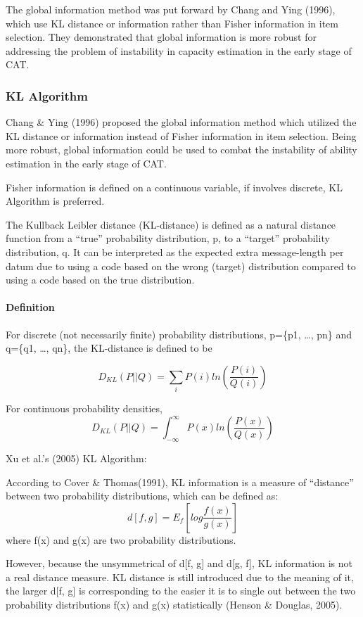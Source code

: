 \documentclass[
]{article}
\begin{document}
The global information method was put forward by Chang and Ying (1996),
which use KL distance or information rather than Fisher information in
item selection. They demonstrated that global information is more robust
for addressing the problem of instability in capacity estimation in the
early stage of CAT.

\hypertarget{kl-algorithm}{%
\subsubsection{KL Algorithm}\label{kl-algorithm}}

Chang \& Ying (1996) proposed the global information method which
utilized the KL distance or information instead of Fisher information in
item selection. Being more robust, global information could be used to
combat the instability of ability estimation in the early stage of CAT.

Fisher information is defined on a continuous variable, if involves
discrete, KL Algorithm is preferred.

The Kullback Leibler distance (KL-distance) is defined as a natural
distance function from a ``true'' probability distribution, p, to a
``target'' probability distribution, q. It can be interpreted as the
expected extra message-length per datum due to using a code based on the
wrong (target) distribution compared to using a code based on the true
distribution.

\hypertarget{definition-2}{%
\paragraph{Definition}\label{definition-2}}

For discrete (not necessarily finite) probability distributions, p=\{p1,
\ldots, pn\} and q=\{q1, \ldots, qn\}, the KL-distance is defined to be

\[D_{KL}(P||Q)=\sum_i P(i)ln(\frac {P(i)}{Q(i)})\]

For continuous probability densities,
\[D_{KL}(P||Q)=\int_{-\infty}^{\infty} P(x)ln(\frac {P(x)}{Q(x)})\]

Xu et al.'s (2005) KL Algorithm:

According to Cover \& Thomas(1991), KL information is a measure of
``distance'' between two probability distributions, which can be defined
as: \[d[f,g]=E_f[log \frac{f(x)}{g(x)}]\] where f(x) and g(x) are two
probability distributions.

However, because the unsymmetrical of d{[}f, g{]} and d{[}g, f{]}, KL
information is not a real distance measure. KL distance is still
introduced due to the meaning of it, the larger d{[}f, g{]} is
corresponding to the easier it is to single out between the two
probability distributions f(x) and g(x) statistically (Henson \&
Douglas, 2005).
\end{document}
